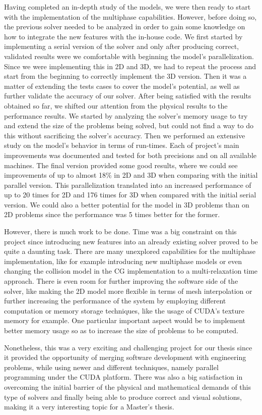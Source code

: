 \documentclass[12pt, openany]{book}
\begin{document}
Having completed an in-depth study of the models, we were then ready to start with the implementation of the multiphase capabilities. However, before doing so, the previous solver needed to be analyzed in order to gain some knowledge on how to integrate the new features with the in-house code. We first started by implementing a serial version of the solver and only after producing correct, validated results were we comfortable with beginning the model's parallelization. Since we were implementing this in 2D and 3D, we had to repeat the process and start from the beginning to correctly implement the 3D version. Then it was a matter of extending the tests cases to cover the model's potential, as well as further validate the accuracy of our solver. After being satisfied with the results obtained so far, we shifted our attention from the physical results to the performance results. We started by analyzing the solver's memory usage to try and extend the size of the problems being solved, but could not find a way to do this without sacrificing the solver's accuracy. Then we performed an extensive study on the model's behavior in terms of run-times. Each of project's main improvements was documented and tested for both precisions and on all available machines. The final version provided some good results, where we could see improvements of up to almost 18\% in 2D and 3D when comparing with the initial parallel version. This parallelization translated into an increased performance of up to 20 times for 2D and 176 times for 3D when compared with the initial serial version. We could also a better potential for the model in 3D problems than on 2D problems since the performance was 5 times better for the former.\par
However, there is much work to be done. Time was a big constraint on this project since introducing new features into an already existing solver proved to be quite a daunting task. There are many unexplored capabilities for the multiphase implementation, like for example introducing new multiphase models or even changing the collision model in the CG implementation to a multi-relaxation time approach. There is even room for further improving the software side of the solver, like making the 2D model more flexible in terms of mesh interpolation or further increasing the performance of the system by employing different computation or memory storage techniques, like the usage of CUDA's texture memory for example. One particular important aspect would be to implement better memory usage so as to increase the size of problems to be computed. \par
Nonetheless, this was a very exciting and challenging project for our thesis since it provided the opportunity of merging software development with engineering problems, while using newer and different techniques, namely parallel programming under the CUDA platform. There was also a big satisfaction in overcoming the initial barrier of the physical and mathematical demands of this type of solvers and finally being able to produce correct and visual solutions, making it a very interesting topic for a Master's thesis.          
\end{document}
